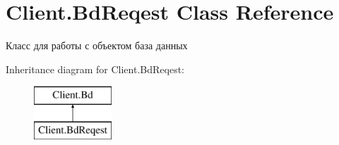 \hypertarget{class_client_1_1_bd_reqest}{}\section{Client.\+Bd\+Reqest Class Reference}
\label{class_client_1_1_bd_reqest}


Класс для работы с объектом база данных  


Inheritance diagram for Client.\+Bd\+Reqest\+:\begin{figure}[H]
\begin{center}
\leavevmode
\includegraphics[height=2.000000cm]{class_client_1_1_bd_reqest}
\end{center}
\end{figure}
